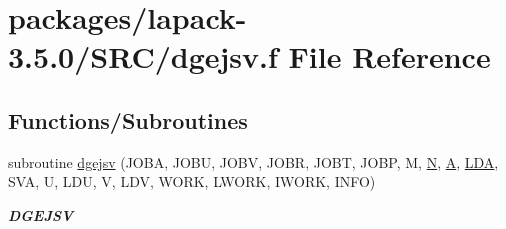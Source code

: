 \hypertarget{dgejsv_8f}{}\section{packages/lapack-\/3.5.0/\+S\+R\+C/dgejsv.f File Reference}
\label{dgejsv_8f}
\subsection*{Functions/\+Subroutines}
\begin{DoxyCompactItemize}
\item 
subroutine \hyperlink{group__doubleGEsing_ga8767bfcf983f8dc6ef2842029ab25599}{dgejsv} (J\+O\+B\+A, J\+O\+B\+U, J\+O\+B\+V, J\+O\+B\+R, J\+O\+B\+T, J\+O\+B\+P, M, \hyperlink{polmisc_8c_a0240ac851181b84ac374872dc5434ee4}{N}, \hyperlink{classA}{A}, \hyperlink{example__user_8c_ae946da542ce0db94dced19b2ecefd1aa}{L\+D\+A}, S\+V\+A, U, L\+D\+U, V, L\+D\+V, W\+O\+R\+K, L\+W\+O\+R\+K, I\+W\+O\+R\+K, I\+N\+F\+O)
\begin{DoxyCompactList}\small\item\em {\bfseries D\+G\+E\+J\+S\+V} \end{DoxyCompactList}\end{DoxyCompactItemize}
